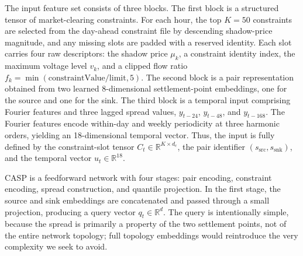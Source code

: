 \documentclass{article}
\begin{document}
The input feature set consists of three blocks. The first block is a structured tensor of market-clearing constraints. For each hour, the top $K=50$ constraints are selected from the day-ahead constraint file by descending shadow-price magnitude, and any missing slots are padded with a reserved identity. Each slot carries four raw descriptors: the shadow price $\mu_k$, a constraint identity index, the maximum voltage level $v_k$, and a clipped flow ratio $f_k = \min(\mathrm{constraintValue}/\mathrm{limit}, 5)$. The second block is a pair representation obtained from two learned 8-dimensional settlement-point embeddings, one for the source and one for the sink. The third block is a temporal input comprising Fourier features and three lagged spread values, $y_{t-24}$, $y_{t-48}$, and $y_{t-168}$. The Fourier features encode within-day and weekly periodicity at three harmonic orders, yielding an 18-dimensional temporal vector. Thus, the input is fully defined by the constraint-slot tensor $C_t \in \mathbb{R}^{K \times d_c}$, the pair identifier $(s_{\mathrm{src}}, s_{\mathrm{snk}})$, and the temporal vector $u_t \in \mathbb{R}^{18}$.

CASP is a feedforward network with four stages: pair encoding, constraint encoding, spread construction, and quantile projection. In the first stage, the source and sink embeddings are concatenated and passed through a small projection, producing a query vector $q_t \in \mathbb{R}^d$. The query is intentionally simple, because the spread is primarily a property of the two settlement points, not of the entire network topology; full topology embeddings would reintroduce the very complexity we seek to avoid.
\end{document}

